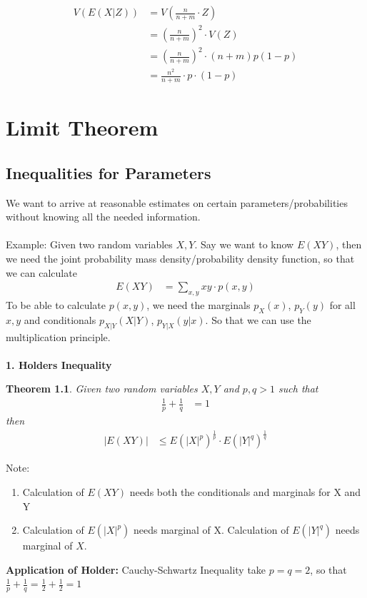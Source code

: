 \documentclass[11pt,oneside]{book}
\theoremstyle{break}
\theoremstyle{break}
\newtheorem{thm}{Theorem}[section]
\newcommand{\note}{\color{Purple}Note: \color{black}}
\newcommand{\example}{\color{WildStrawberry}Example: \color{black}}
\begin{document}
\begin{align*}
V(E(X|Z))&=V\left( \frac{n}{n+m}\cdot Z\right)\\
&=\left(\frac{n}{n+m}\right)^2\cdot V(Z)\\
&=\left(\frac{n}{n+m}\right)^2\cdot (n+m)p(1-p)\\
&=\frac{n^2}{n+m} \cdot p\cdot (1-p)
\end{align*}
\chapter[Limit Theorem]{Limit Theorem}
\section[Inequalities for Parameters]{\color{DarkOrchid}Inequalities for Parameters}
We want to arrive at reasonable estimates on certain parameters/probabilities without knowing all the needed information.\\
\hfill\\
\example Given two random variables $X,Y$. Say we want to know $E(XY)$, then we need the joint probability mass density/probability density function, so that we can calculate \begin{align*}
E(XY)&=\sum_{x,y}xy\cdot p(x,y)
\end{align*}
To be able to calculate $p(x,y)$, we need the marginals $p_X(x)$, $p_Y(y)$ for all $x,y$ and conditionals $p_{X|Y}(X|Y)$, $p_{Y|X}(y|x)$. So that we can use the multiplication principle.\\
\hfill\\
\textbf{1. Holders Inequality}\\
\begin{thm}Given two random variables $X,Y$ and $p,q>1$ such that \begin{align*}
\frac{1}{p}+\frac{1}{q}&=1
\end{align*}
then \begin{align*}
|E(XY)|&\leq E(|X|^p)^{\frac{1}{p}} \cdot E(|Y|^q)^{\frac{1}{q}}
\end{align*}
\end{thm}
\note \begin{enumerate}
\item Calculation of $E(XY)$ needs both the conditionals and marginals for X and Y
\item Calculation of $E(|X|^p)$ needs marginal of X. Calculation of $E(|Y|^q)$ needs marginal of $X$.
\end{enumerate}
\textbf{Application of Holder:} Cauchy-Schwartz Inequality take $p=q=2$, so that $\frac{1}{p}+\frac{1}{q}=\frac{1}{2}+\frac{1}{2}=1$\\
\end{document}

